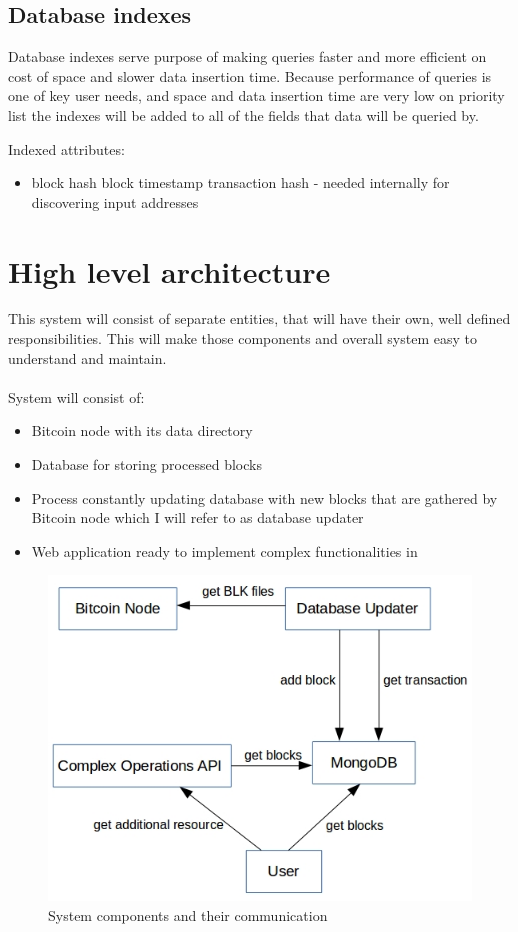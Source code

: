\documentclass[12pt, en, eng, oneside]{mgr}
\begin{document}
 

\subsection{Database indexes}

Database indexes serve purpose of making queries faster and more efficient on cost of space and slower data insertion time.
Because performance of queries is one of key user needs, and space and data insertion time are very low on priority list the indexes will be added to all of the fields that data will be queried by.

Indexed attributes:
\begin{itemize}
\item
block hash
block timestamp
transaction hash - needed internally for discovering input addresses
\end{itemize} 


\section{High level architecture}
This system will consist of separate entities, that will have their own, well defined responsibilities. This will make those components and overall system easy to understand and maintain.
\\
\\
System will consist of:
\begin{itemize}
\item
Bitcoin node with its data directory
\item
Database for storing processed blocks
\item
Process constantly updating database with new blocks that are gathered by Bitcoin node which I will refer to as database updater
\item
Web application ready to implement complex functionalities in
\end{itemize}

\begin{figure}[H]
  \includegraphics[width=0.8\linewidth]{component-diagram.png}
  \caption{System components and their communication}
  \label{fig:system-components-and-their-communication}
\end{figure}
\end{document}
